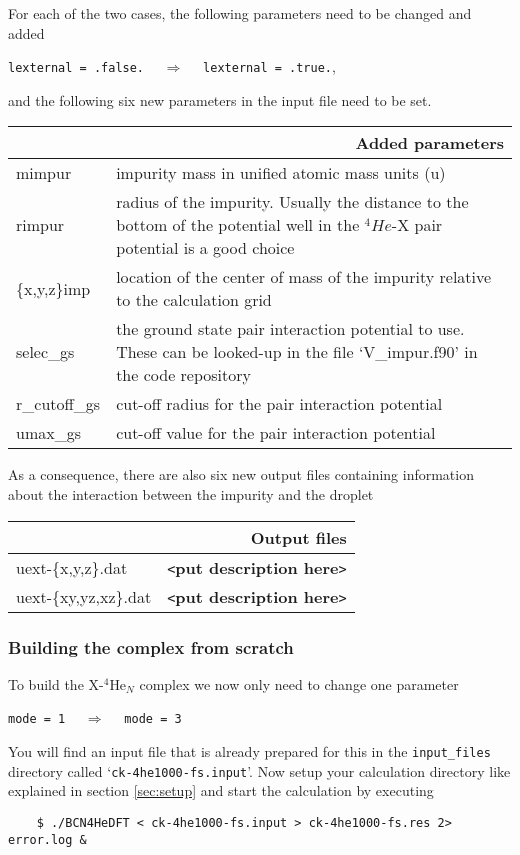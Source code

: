 \documentclass[10pt,a4paper]{article}
\begin{document}
	For each of the two cases, the following parameters need to be changed and added
	\begin{center}
	\verb|lexternal = .false.|	$\quad\Longrightarrow\quad$	\verb|lexternal = .true.|,
	\end{center}
	and the following six new parameters in the input file need to be set.

	\begin{center}
	\begin{tabular}{l|p{9.75cm}}
		\multicolumn{2}{r}{\textbf{Added parameters}} \\
		\hline\hline
		mimpur 			& impurity mass in unified atomic mass units (u) 	\\
		rimpur			& radius of the impurity. Usually the distance to the bottom of the potential well in the $^4He$-X pair potential is a good choice	\\
		\{x,y,z\}imp	& location of the center of mass of the impurity relative to the calculation grid	\\
		selec\_gs		& the ground state pair interaction potential to use. These can be looked-up in the file `V\_impur.f90' in the code repository\\
		r\_cutoff\_gs	& cut-off radius for the pair interaction potential 	\\
		umax\_gs 		& cut-off value for the pair interaction potential
	\end{tabular}
	\end{center}
	\vspace{0.2cm}
	As a consequence, there are also six new output files containing information about the interaction between the impurity and the droplet
	
		\begin{center}
		\begin{tabular}{l|p{7.5cm}}
			\multicolumn{2}{r}{\textbf{Output files}} \\
			\hline\hline
			uext-\{x,y,z\}.dat			& \verb|<|\textbf{put description here}\verb|>| \\
			\hline
			uext-\{xy,yz,xz\}.dat				& \verb|<|\textbf{put description here}\verb|>| \\
		\end{tabular}
	\end{center}

	\subsubsection{Building the complex from scratch}\label{sec:ck-fs}
	To build the X-$^4$He$_N$ complex we now only need to change one parameter
	\begin{center}
	\verb|mode = 1|	$\quad\Longrightarrow\quad$	\verb|mode = 3|
	\end{center}
	You will find an input file that is already prepared for this in the \verb|input_files| directory called `\verb|ck-4he1000-fs.input|'. Now setup your calculation directory like explained in section \ref{sec:setup} and start the calculation by executing
	\begin{verbatim}
	$ ./BCN4HeDFT < ck-4he1000-fs.input > ck-4he1000-fs.res 2> error.log &
	\end{verbatim}	
	
\end{document}
